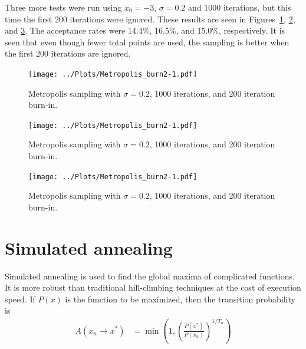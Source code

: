 \documentclass[twocolumn]{myarticle}
\begin{document}
Three more tests were run using $ x_0 = -3 $, $ \sigma = 0.2 $ and 1000 iterations, but this time the first 200 iterations were ignored.
These results are seen in Figures~\ref{fig:metropolis_burn_2_1}, \ref{fig:metropolis_burn_2_2}, and \ref{fig:metropolis_burn_2_3}.
The acceptance rates were 14.4\%, 16.5\%, and 15.0\%, respectively.
It is seen that even though fewer total points are used, the sampling is better when the first 200 iterations are ignored.

\begin{figure}[ht!]
    \begin{center}
    \texttt{[image: ../Plots/Metropolis\_burn2-1.pdf]}
    \caption{%
    Metropolis sampling with $ \sigma = 0.2 $, 1000 iterations, and 200 iteration burn-in.
    }
    \label{fig:metropolis_burn_2_1}
    \end{center}
\end{figure}

\begin{figure}[ht!]
    \begin{center}
    \texttt{[image: ../Plots/Metropolis\_burn2-1.pdf]}
    \caption{%
    Metropolis sampling with $ \sigma = 0.2 $, 1000 iterations, and 200 iteration burn-in.
    }
    \label{fig:metropolis_burn_2_2}
    \end{center}
\end{figure}

\begin{figure}[ht!]
    \begin{center}
    \texttt{[image: ../Plots/Metropolis\_burn2-1.pdf]}
    \caption{%
    Metropolis sampling with $ \sigma = 0.2 $, 1000 iterations, and 200 iteration burn-in.
    }
    \label{fig:metropolis_burn_2_3}
    \end{center}
\end{figure}

\section{Simulated annealing}
\label{sec:simulated_annealing}

Simulated annealing is used to find the global maxima of complicated functions.
It is more robust than traditional hill-climbing techniques at the cost of execution speed.
If $ P(x) $ is the function to be maximized, then the transition probability is
\begin{align}
    A\left(x_n \to x^*\right) &= \min \left( 1, \left( \frac{P\left( x^* \right)}{P \left( x_n \right)} \right)^{1/T_n} \right)
\end{align}
\end{document}
